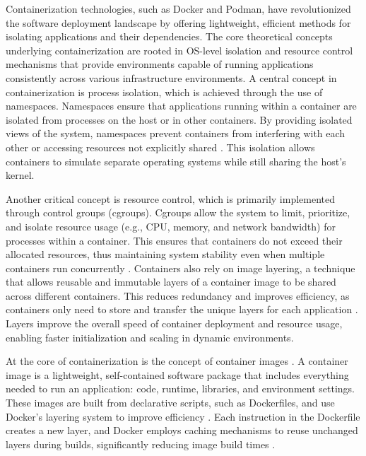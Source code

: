 Containerization technologies, such as Docker and Podman, have revolutionized
the software deployment landscape by offering lightweight, efficient methods
for isolating applications and their dependencies. The core theoretical
concepts underlying containerization are rooted in OS-level isolation and
resource control mechanisms that provide environments capable of running
applications consistently across various infrastructure environments.
A central concept in containerization is process isolation, which is achieved
through the use of namespaces. Namespaces ensure that applications running
within a container are isolated from processes on the host or in other
containers. By providing isolated views of the system, namespaces prevent
containers from interfering with each other or accessing resources not
explicitly shared \cite{Cgroups2024}. This isolation allows containers to
simulate separate operating systems while still sharing the host's kernel.

Another critical concept is resource control, which is primarily implemented
through control groups (cgroups). Cgroups allow the system to limit,
prioritize, and isolate resource usage (e.g., CPU, memory, and network
bandwidth) for processes within a container. This ensures that containers do
not exceed their allocated resources, thus maintaining system stability even
when multiple containers run concurrently \cite[Under the Hood]{merkelDockerLightweightLinux2014}.
Containers also rely on image layering, a technique
that allows reusable and immutable layers of a container image to be shared
across different containers. This reduces redundancy and improves efficiency,
as containers only need to store and transfer the unique layers for each
application \cite[Chapter 2.4]{merkelDockerLightweightLinux2014}. Layers
improve the overall speed of container deployment and resource usage,
enabling faster initialization and scaling in dynamic environments.

At the core of containerization is the concept of container images
\cite{SystemImage2024}. A container image is a lightweight, self-contained
software package that includes everything needed to run an application: code,
runtime, libraries, and environment settings. These images are built from
declarative scripts, such as Dockerfiles, and use Docker's layering system to
improve efficiency \cite{UnderstandingImageLayers0200}. Each instruction in
the Dockerfile creates a new layer, and Docker employs caching mechanisms to
reuse unchanged layers during builds, significantly reducing image build
times \cite{Cache0200}.

